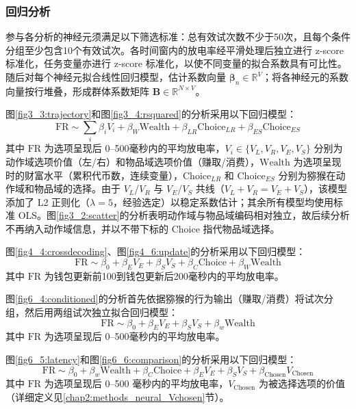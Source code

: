 \subsubsection{回归分析}

参与各分析的神经元须满足以下筛选标准：总有效试次数不少于50次，且每个条件分组至少包含10个有效试次。各时间窗内的放电率经平滑处理后独立进行 z-score 标准化，任务变量亦进行 z-score 标准化，以使不同变量的拟合系数具有可比性。随后对每个神经元拟合线性回归模型，估计系数向量 $\boldsymbol{\beta}_n \in \mathbb{R}^{V}$；将各神经元的系数向量按行堆叠，形成群体系数矩阵 $\mathbf{B} \in \mathbb{R}^{N \times V}$。

图\ref{fig3_3:trajectory}和图\ref{fig3_4:rsquared}的分析采用以下回归模型：
\begin{equation}
\mathrm{FR} \sim \sum_i \beta_i V_i + \beta_W \mathrm{Wealth} + \beta_{LR} \mathrm{Choice}_{LR} + \beta_{ES} \mathrm{Choice}_{ES}
\end{equation}
其中 $\mathrm{FR}$ 为选项呈现后 0--500毫秒内的平均放电率，$V_i \in \{V_L, V_R,V_E, V_S\}$ 分别为动作域选项价值（左/右）和物品域选项价值（赚取/消费），$\mathrm{Wealth}$ 为选项呈现时的财富水平（累积代币数，连续变量），$\mathrm{Choice}_{LR}$ 和 $\mathrm{Choice}_{ES}$ 分别为猕猴在动作域和物品域的选择。由于 $V_L$/$V_R$ 与 $V_E$/$V_S$ 共线（$V_L + V_R = V_E + V_S$），该模型添加了 L2 正则化（$\lambda = 5$，经验选定）以稳定系数估计；其余所有模型均使用标准 OLS。图\ref{fig3_2:scatter}的分析表明动作域与物品域编码相对独立，故后续分析不再纳入动作域信息，并以不带下标的 $\mathrm{Choice}$ 指代物品域选择。

图\ref{fig4_4:crossdecoding}、图\ref{fig4_6:update}的分析采用以下回归模型：
\begin{equation}
\mathrm{FR} \sim \beta_0 + \beta_E V_E + \beta_S V_S + \beta_C \mathrm{Choice} + \beta_W \mathrm{Wealth}
\end{equation}
其中 $\mathrm{FR}$ 为钱包更新前100到钱包更新后200毫秒内的平均放电率。

图\ref{fig6_4:conditioned}的分析首先依据猕猴的行为输出（赚取/消费）将试次分组，然后用两组试次独立拟合回归模型：
\begin{equation}
\mathrm{FR} \sim \beta_0 + \beta_E V_E + \beta_S V_S + \beta_w \mathrm{Wealth}
\end{equation}
其中 $\mathrm{FR}$ 为选项呈现后 0--500毫秒内的平均放电率。

图\ref{fig6_5:latency}和图\ref{fig6_6:comparison}的分析采用以下回归模型：
\begin{equation}
\mathrm{FR} \sim \beta_0 + \beta_w \mathrm{Wealth} + \beta_C \mathrm{Choice} + \beta_E V_E + \beta_S V_S + \beta_{\mathrm{Chosen}} V_{\mathrm{Chosen}}
\end{equation}
其中 $\mathrm{FR}$ 为选项呈现后 0--500 毫秒内的平均放电率，$V_{\mathrm{Chosen}}$ 为被选择选项的价值（详细定义见\ref{chap2:methods_neural_Vchosen}节）。

